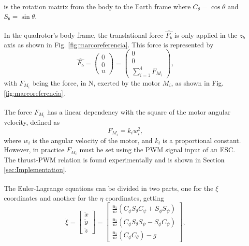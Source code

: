 is the rotation matrix from the body to the Earth frame where $C_\theta = \cos\theta$ and $S_\theta = \sin\theta$.
\\\\
In the quadrotor's body frame, the translational force $\hat{F_{b}}$ is only applied in the $z_{b}$ axis as shown in Fig. \ref{fig:marcoreferencia}. This force is represented by
\begin{equation}
	\hat{F_{b}}=\begin{pmatrix}
	0\\
	0\\
	u
	\end{pmatrix} = \begin{pmatrix}
	0\\
	0\\
	\sum_{i=1}^{4}F_{M_i}
	\end{pmatrix}  ,
 \label{ec:fuerzas}
 \end{equation} 
with $ F_{M_i} $ being the force, in N, exerted by the motor $ M_{i}$, as shown in Fig. \ref{fig:marcoreferencia}.
\\\\
The force $ F_{M_i} $ has a linear dependency with the square of the motor angular velocity, defined as
\begin{equation}
	F_{M_i}=k_{i}w_{i}^{2},
	\label{ec:fi}
\end{equation}
where $ w_{i} $ is the angular velocity of the motor, and $ k_{i} $ is a proportional constant. However, in practice $F_{M_i}$ must be set using the PWM signal input of an ESC. The thrust-PWM relation is found experimentally and is shown in Section \ref{sec:Implementation}.
\\\\
The Euler-Lagrange equations can be divided in two parts, one for the $\xi$ coordinates and another for the $\eta$ coordinates, getting
\begin{equation}
\label{eqn:E-L1}
\ddot{\xi} =
\begin{bmatrix}
\ddot{x} \\ \ddot{y} \\ \ddot{z}
\end{bmatrix} 
=
\begin{bmatrix}
\frac{u_{1}}{m}(C_\phi S_\theta C_\psi + S_\phi S_\psi) \\
 \frac{u_{1}}{m}(C_\phi S_\theta S_\psi - S_\phi C_\psi) \\
\frac{u_{1}}{m}(C_\phi C_\theta) - g
\end{bmatrix},
\end{equation}
